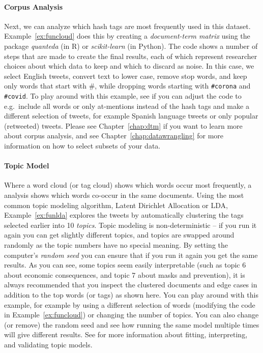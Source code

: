 \paragraph{Corpus Analysis} Next, we can analyze which hash tags are most frequently used in this dataset.
Example~\ref{ex:funcloud} does this by creating a \emph{document-term matrix} using the package \emph{quanteda} (in R)
or \emph{scikit-learn} (in Python).
The code shows a number of steps that are made to create the final results, each of which represent
researcher choices about which data to keep and which to discard as noise.
In this case,  we select English tweets, convert text to lower case, remove stop words, and keep only words that start with \#,
while dropping words starting with \verb+#corona+ and \verb+#covid+.
To play around with this example,
see if you can adjust the code to e.g.\ include all words or only at-mentions instead of the hash tags
and make a different selection of tweets, for example Spanish language tweets or only popular (retweeted) tweets.
Please see Chapter~\ref{chap:dtm} if you want to learn more about corpus analysis,
and see Chapter~\ref{chap:datawrangling} for more information on how to select subsets of your data.


\paragraph{Topic Model}
Where a word cloud (or tag cloud) shows which words occur most frequently,
a  analysis shows which words co-occur in the same documents.
Using the most common topic modeling algorithm, Latent Dirichlet Allocation or LDA,
Example~\ref{ex:funlda} explores the tweets by automatically clustering the tags selected earlier into 10 \emph{topics}.
Topic modeling is non-deterministic -- if you run it again you can get slightly different topics,
and topics are swapped around randomly as the topic numbers have no special meaning.
By setting the computer's \emph{random seed} you can ensure that if you run it again you get the same results.
As you can see, some topics seem easily interpretable (such as topic 6 about economic consequences,
and topic 7 about masks and prevention), it is always recommended that you inspect the clustered documents
and edge cases in addition to the top words (or tags) as shown here.
You can play around with this example, for example by using a different selection of words
(modifying the code in Example~\ref{ex:funcloud}) or changing the number of topics.
You can also change (or remove) the random seed and see how running the same model multiple times will give different results. 
See  for more information about fitting, interpreting, and validating topic models.

